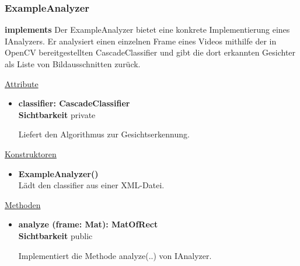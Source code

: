 \subsubsection{ExampleAnalyzer} \label{service:klasse:ExampleAnalyzer}
\textbf{implements}  \newline
Der ExampleAnalyzer bietet eine konkrete Implementierung eines IAnalyzers. Er analysiert einen einzelnen Frame eines Videos mithilfe der in OpenCV bereitgestellten CascadeClassifier und gibt die dort erkannten Gesichter als Liste von Bildausschnitten zurück. \newline

\underline{Attribute}
\begin{itemize}
\itemsep0pt
\item \textbf{classifier: CascadeClassifier} \hfill\\ 
\textbf{Sichtbarkeit} private

Liefert den Algorithmus zur Gesichtserkennung.
\end{itemize}

\underline{Konstruktoren}
\begin{itemize}
\itemsep0pt
\item \textbf{ExampleAnalyzer()} \hfill\\
Lädt den classifier aus einer XML-Datei.
\end{itemize}

\underline{Methoden}
\begin{itemize}
\itemsep0pt
\item \textbf{analyze (frame: Mat): MatOfRect}\hfill\\
\textbf{Sichtbarkeit} public

Implementiert die Methode analyze(..) von IAnalyzer.

\end{itemize}